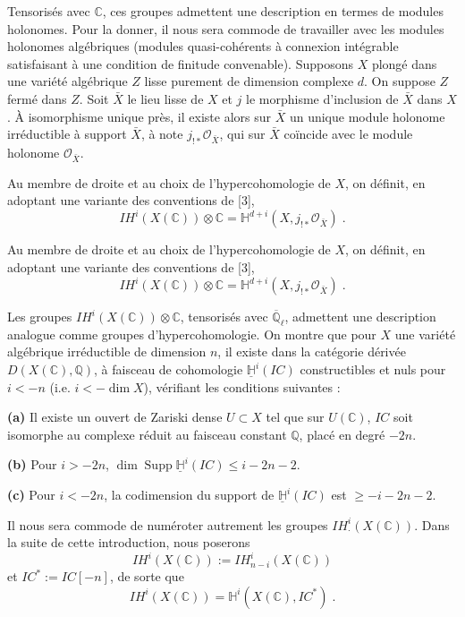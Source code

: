 \documentclass[12pt,a4paper]{article}
\theoremstyle{plain}
\theoremstyle{definition}
\theoremstyle{remark}
\DeclareMathOperator{\Supp}{Supp}
\DeclareMathOperator{\pdim}{dim}
\newcommand{\IH}{\mathit{IH}}
\newcommand{\HH}{\mathbb{H}}
\newcommand{\IC}{\mathit{IC}}
\newcommand{\CC}{\mathbb{C}}
\newcommand{\QQ}{\mathbb{Q}}
\newcommand{\cO}{\mathcal{O}}
\begin{document}
\medskip

Tensorisés avec $\CC$, ces groupes admettent une description en termes de modules holonomes. Pour la donner, il nous sera commode de travailler avec les modules holonomes algébriques (modules quasi-cohérents à connexion intégrable satisfaisant à une condition de finitude convenable). Supposons $X$ plongé dans une variété algébrique $Z$ lisse purement de dimension complexe $d$. On suppose $Z$ fermé dans $Z$. Soit $\bar{X}$ le lieu lisse de $X$ et $j$ le morphisme d'inclusion de $\bar{X}$ dans $X$. À isomorphisme unique près, il existe alors sur $\bar{X}$ un unique module holonome irréductible à support $\bar{X}$, à note $j_{!*}\cO_{\bar{X}}$, qui sur $\bar{X}$ coïncide avec le module holonome $\cO_{\bar{X}}$.

\medskip

Au membre de droite et au choix de l'hypercohomologie de $X$, on définit, en adoptant une variante des conventions de [3],
\[
\IH^{i}(X(\CC)) \otimes \CC = \HH^{d+i}(X, j_{!*}\cO_{\bar{X}})\;.
\]


Au membre de droite et au choix de l'hypercohomologie de $X$, on définit, en adoptant une variante des conventions de [3],
\[
\IH^{i}(X(\CC)) \otimes \CC = \HH^{d+i}(X, j_{!*}\cO_{\bar{X}})\;.
\]

Les groupes $\IH^{i}(X(\CC)) \otimes \CC$, tensorisés avec $\overline{\QQ}_{\ell}$, admettent une description analogue comme groupes d'hypercohomologie. On montre que pour $X$ une variété algébrique irréductible de dimension $n$, il existe dans la catégorie dérivée $D(X(\CC), \QQ)$, à faisceau de cohomologie $\underline{\HH}^{i}(\IC)$ constructibles et nuls pour $i < -n$ (i.e. $i < -\pdim X$), vérifiant les conditions suivantes :

\medskip

\noindent
\textbf{(a)} Il existe un ouvert de Zariski dense $U \subset X$ tel que sur $U(\CC)$, $\IC$ soit isomorphe au complexe réduit au faisceau constant $\QQ$, placé en degré $-2n$.

\smallskip

\noindent
\textbf{(b)} Pour $i > -2n$, $\pdim \Supp \underline{\HH}^{i}(\IC) \leq i - 2n - 2$.

\smallskip

\noindent
\textbf{(c)} Pour $i < -2n$, la codimension du support de $\underline{\HH}^{i}(\IC)$ est $\geq -i - 2n - 2$.

\medskip

Il nous sera commode de numéroter autrement les groupes $\IH^{i}_{\cdot}(X(\CC))$. Dans la suite de cette introduction, nous poserons
\[
\IH^{i}(X(\CC)) := \IH^{i}_{n-i}(X(\CC))
\]
et $\IC^{*} := \IC[-n]$, de sorte que
\[
\IH^{i}(X(\CC)) = \HH^{i}(X(\CC), \IC^{*})\;.
\]
\end{document}
